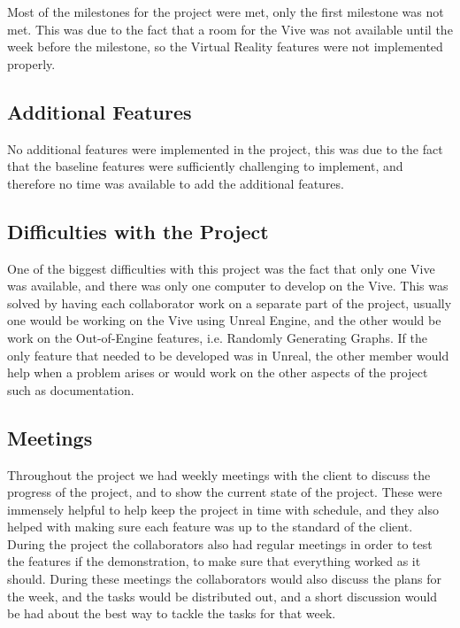 	Most of the milestones for the project were met, only the first milestone was not met. This was due to the fact that a room for the Vive was not available until the week before the milestone, so the Virtual Reality features were not implemented properly.

\subsection{Additional Features}
	No additional features were implemented in the project, this was due to the fact that the baseline features were sufficiently challenging to implement, and therefore no time was available to add the additional features.

\subsection{Difficulties with the Project}
	One of the biggest difficulties with this project was the fact that only one Vive was available, and there was only one computer to develop on the Vive. This was solved by having each collaborator work on a separate part of the project, usually one would be working on the Vive using Unreal Engine, and the other would be work on the Out-of-Engine features, i.e. Randomly Generating Graphs. If the only feature that needed to be developed was in Unreal, the other member would help when a problem arises or would work on the other aspects of the project such as documentation.
	
\subsection{Meetings}
	Throughout the project we had weekly meetings with the client to discuss the progress of the project, and to show the current state of the project. These were immensely helpful to help keep the project in time with schedule, and they also helped with making sure each feature was up to the standard of the client.
	During the project the collaborators also had regular meetings in order to test the features if the demonstration, to make sure that everything worked as it should. During these meetings the collaborators would also discuss the plans for the week, and the tasks would be distributed out, and a short discussion would be had about the best way to tackle the tasks for that week.